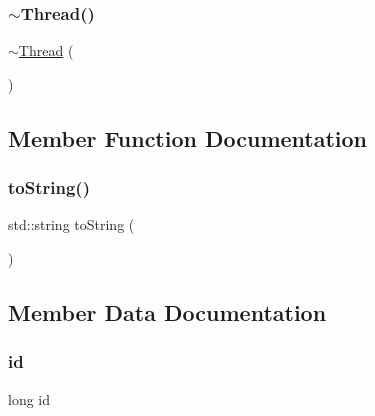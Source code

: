 \subsubsection{\texorpdfstring{$\sim$\+Thread()}{~Thread()}}
{\footnotesize\ttfamily $\sim$\mbox{\hyperlink{classThread}{Thread}} (\begin{DoxyParamCaption}{ }\end{DoxyParamCaption})\hspace{0.3cm}{\ttfamily [virtual]}}



\subsection{Member Function Documentation}
\mbox{\label{classThread_abcb3be8f01217ad05e590b45da6fc827}} 
\subsubsection{\texorpdfstring{to\+String()}{toString()}}
{\footnotesize\ttfamily std\+::string to\+String (\begin{DoxyParamCaption}{ }\end{DoxyParamCaption})}



\subsection{Member Data Documentation}
\mbox{\label{classThread_a7350fbd6ad10618f3b750b1f99ca5c3c}} 
\subsubsection{\texorpdfstring{id}{id}}
{\footnotesize\ttfamily long id}

